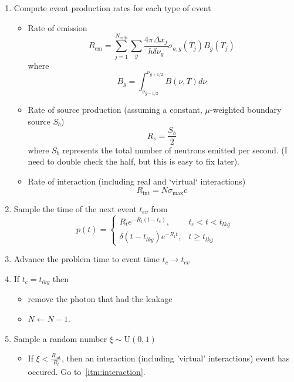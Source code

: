 \documentclass{article}
\newcommand{\ncl}{\ensuremath{N_{\text{cells}}}}
\newcommand{\Rin}{\ensuremath{R_{\text{int}}}}
\newcommand{\Rem}{\ensuremath{R_{\text{em}}}}
\begin{document}
\begin{enumerate}
\item Compute event production rates for each type of event
\begin{itemize}
  \item Rate of emission
\begin{equation}
  \Rem = \sum_{j=1}^{\ncl} \sum_{g} \frac{4\pi\Delta x_j}{h \delta \nu_g} \sigma_{a,g}(T_j)B_g(T_j)
\end{equation}
where
\begin{equation}
  B_g = \int_{\nu_{g-1/2}}^{\nu_{g+1/2}} B(\nu,T)  d \nu
\end{equation}
  \item Rate of source production (assuming a constant, $\mu$-weighted boundary
source $S_b$)
\begin{equation}
  R_s = \frac{S_b}{2} 
\end{equation}
where $S_b$ represents the total number of neutrons emitted per second. (I need
to double check the half, but this is easy to fix later).
  \item Rate of interaction (including real and `virtual` interactions)
\begin{equation}
  \Rin = N \sigma_{\max} c
\end{equation}
\end{itemize}
\item \label{itm:time_loop} Sample the time of the next event $t_{ev}$ from
\begin{equation}
p(t) = \left\{\begin{matrix}
          R_t e^{-R_t (t-t_c)}, & t_c < t < t_{lkg}   \\ 
          \delta(t-t_{lkg})e^{-R_t t}, & t \geq t_{lkg} 
\end{matrix}\right.
\end{equation}
\item Advance the problem time to event time $t_c \rightarrow t_{ev}$
\item If $t_c = t_{lkg}$ then
\begin{itemize}
  \item remove the photon that had the leakage
  \item $N\leftarrow N-1$.
\end{itemize}
\item Sample a random number $\xi\sim\text{U}(0,1)$
\begin{itemize}
\item If $\xi < \frac{\Rin}{R_{t}}$, then an interaction (including 'virtual'
interactions) event has occured. Go to~\ref{itm:interaction}.

\end{itemize}
\end{enumerate}
\end{document}
